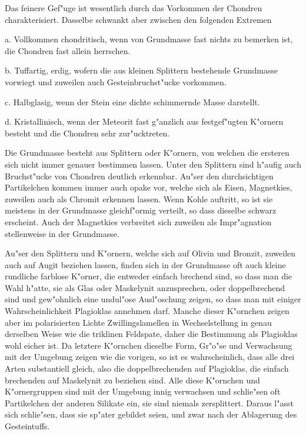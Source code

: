 \documentclass[a4paper, 11pt, oneside, polutonikogreek, german]{article}
\begin{document}
Das feinere Gef"uge ist wesentlich durch das Vorkommen der Chondren charakterisiert. Dasselbe schwankt aber zwischen den folgenden Extremen

a. Vollkommen chondritisch, wenn von Grundmasse fast nichts zu bemerken ist, die Chondren fast allein herrschen.

b. Tuffartig, erdig, wofern die aus kleinen Splittern bestehende Grundmasse vorwiegt und zuweilen auch Gesteinbruchst"ucke vorkommen.

c. Halbglasig, wenn der Stein eine dichte schimmernde Masse darstellt.

d. Kristallinisch, wenn der Meteorit fast g"anzlich aus festgef"ugten K"ornern besteht und die Chondren sehr zur"ucktreten.

Die Grundmasse besteht aus Splittern oder K"ornern, von welchen die ersteren sich nicht immer genauer bestimmen lassen. Unter den Splittern sind h"aufig auch Bruchst"ucke von Chondren deutlich erkennbar. Au"ser den durchsichtigen Partikelchen kommen immer auch opake vor, welche sich als Eisen, Magnetkies, zuweilen auch als Chromit erkennen lassen. Wenn Kohle auftritt, so ist sie meistens in der Grundmasse gleichf"ormig verteilt, so dass dieselbe schwarz erscheint. Auch der Magnetkies verbreitet sich zuweilen als Impr"agnation stellenweise in der Grundmasse.

Au"ser den Splittern und K"ornern, welche sich auf Olivin und Bronzit, zuweilen auch auf Augit beziehen lassen, finden sich in der Grundmasse oft auch kleine rundliche farblose K"orner, die entweder einfach brechend sind, so dass man die Wahl h"atte, sie als Glas oder Maskelynit anzusprechen, oder doppelbrechend sind und gew"ohnlich eine undul"ose Ausl"oschung zeigen, so dass man mit einiger Wahrscheinlichkeit Plagioklas annehmen darf. Manche dieser K"ornchen zeigen aber im polarisierten Lichte Zwillingslamellen in Wechselstellung in genau derselben Weise wie die triklinen Feldspate, daher die Bestimmung als Plagioklas wohl eicher ist. Da letztere K"ornchen dieselbe Form, Gr"o"se und Verwachsung mit der Umgebung zeigen wie die vorigen, so ist es wahrscheinlich, dass alle drei Arten substantiell gleich, also die doppelbrechenden auf Plagioklas, die einfach brechenden auf Maskelynit zu beziehen sind. Alle diese K"ornchen und K"ornergruppen sind mit der Umgebung innig verwachsen und schlie"sen oft Partikelchen der anderen Silikate ein, sie sind niemals zersplittert. Daraus l"asst sich schlie"sen, dass sie sp"ater gebildet seien, und zwar nach der Ablagerung des Gesteintuffs.
\end{document}
